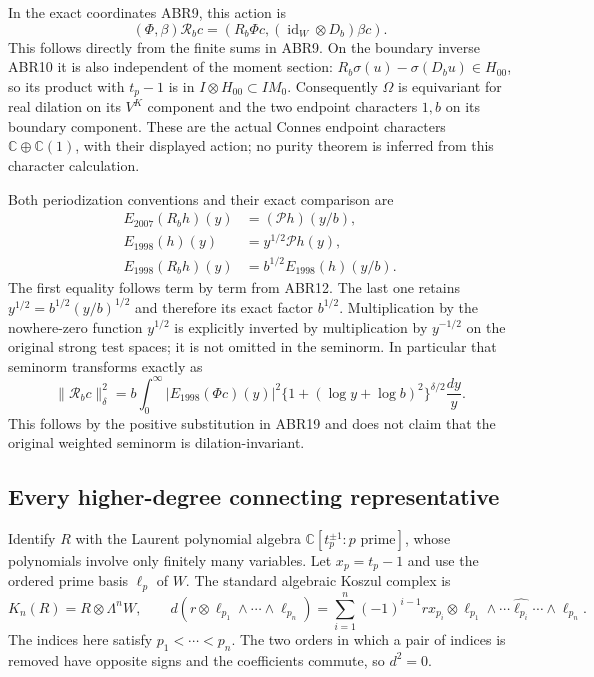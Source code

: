 In the exact coordinates ABR9, this action is
\begin{equation}\tag{ABR19b}
 (\Phi,\beta)\mathscr R_b c
   =\left(R_b\Phi c,
                (\operatorname{id}_W\otimes D_b)\beta c\right).
\end{equation}
This follows directly from the finite sums in ABR9. On the boundary
inverse ABR10 it is also independent of the moment section:
$R_b\sigma(u)-\sigma(D_bu)\in H_{00}$, so its product with
$t_p-1$ is in $I\otimes H_{00}\subset IM_0$. Consequently
$\Omega$ is equivariant for real dilation on its $V^K$ component
and the two endpoint characters $1,b$ on its boundary component.
These are the actual Connes endpoint characters
$\mathbb C\oplus\mathbb C(1)$, with their displayed action;
no purity theorem is inferred from this character calculation.

Both periodization conventions and their exact comparison are
\begin{equation}\tag{ABR19c}
 \begin{split}
 E_{2007}(R_bh)(y)&=(\mathcal P h)(y/b),\\
 E_{1998}(h)(y)&=y^{1/2}\mathcal P h(y),\\
 E_{1998}(R_bh)(y)&=b^{1/2}E_{1998}(h)(y/b).
 \end{split}
\end{equation}
The first equality follows term by term from ABR12. The last one
retains $y^{1/2}=b^{1/2}(y/b)^{1/2}$ and therefore its exact
factor $b^{1/2}$. Multiplication by the nowhere-zero function
$y^{1/2}$ is explicitly inverted by multiplication by $y^{-1/2}$
on the original strong test spaces; it is not omitted in the
seminorm. In particular that seminorm transforms exactly as
\begin{equation}\tag{ABR19d}
 \|\mathscr R_b c\|_\delta^2
   =b\int_0^\infty|E_{1998}(\Phi c)(y)|^2
       \{1+(\log y+\log b)^2\}^{\delta/2}\frac{dy}{y}.
\end{equation}
This follows by the positive substitution in ABR19 and does not
claim that the original weighted seminorm is dilation-invariant.

\subsection{Every higher-degree connecting representative}

Identify $R$ with the Laurent polynomial algebra
$\mathbb C[t_p^{\pm1}:p\text{ prime}]$, whose polynomials involve
only finitely many variables. Let $x_p=t_p-1$ and use the ordered
prime basis $\ell_p$ of $W$. The standard algebraic Koszul complex is
\begin{equation}\tag{ABR20}
 K_n(R)=R\otimes\Lambda^nW,\qquad
 d(r\otimes\ell_{p_1}\wedge\cdots\wedge\ell_{p_n})
  =\sum_{i=1}^n(-1)^{i-1}rx_{p_i}\otimes
       \ell_{p_1}\wedge\cdots\widehat{\ell_{p_i}}\cdots
                              \wedge\ell_{p_n}.
\end{equation}
The indices here satisfy $p_1<\cdots<p_n$. The two orders in
which a pair of indices is removed have opposite signs and
the coefficients commute, so $d^2=0$.

